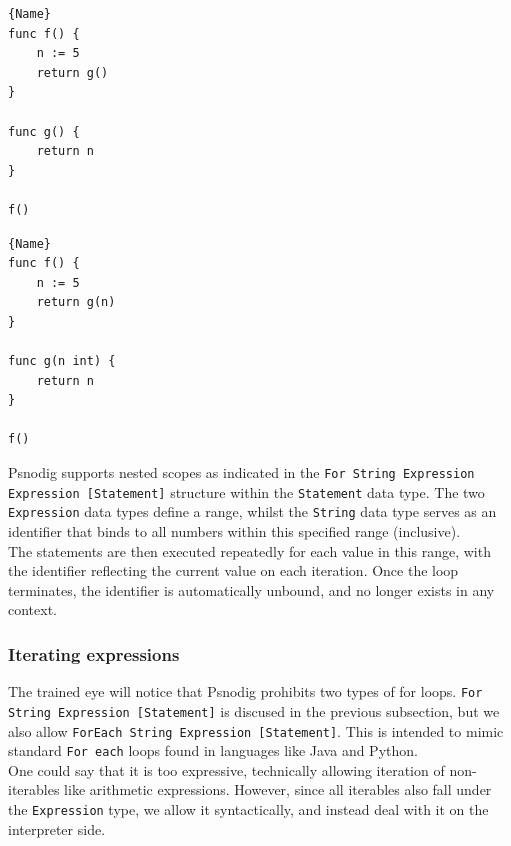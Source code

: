 \begin{minipage}{.45\textwidth}
\begin{lstlisting}[caption=Code with error, captionpos=b]{Name}
func f() {
    n := 5
    return g()
}

func g() {
    return n
}

f()
\end{lstlisting}
\end{minipage}\hfill
\begin{minipage}{.45\textwidth}
\begin{lstlisting}[caption=Code without error, captionpos=b]{Name}
func f() {
    n := 5
    return g(n)
}

func g(n int) {
    return n
}

f()
\end{lstlisting}
\end{minipage}

Psnodig supports nested scopes as indicated in the \texttt{For String Expression Expression [Statement]} structure within the \texttt{Statement} data type. The two \texttt{Expression} data types define a range, whilst the \texttt{String} data type serves as an identifier that binds to all numbers within this specified range (inclusive). \hfill \\

The statements are then executed repeatedly for each value in this range, with the identifier reflecting the current value on each iteration. Once the loop terminates, the identifier is automatically unbound, and no longer exists in any context.

\subsubsection{Iterating expressions}

The trained eye will notice that Psnodig prohibits two types of for loops. \texttt{For String Expression [Statement]} is discused in the previous subsection, but we also allow \texttt{ForEach String Expression [Statement]}. This is intended to mimic standard \texttt{For each} loops found in languages like Java and Python. \hfill \\

One could say that it is too expressive, technically allowing iteration of non-iterables like arithmetic expressions. However, since all iterables also fall under the \texttt{Expression} type, we allow it syntactically, and instead deal with it on the interpreter side.

